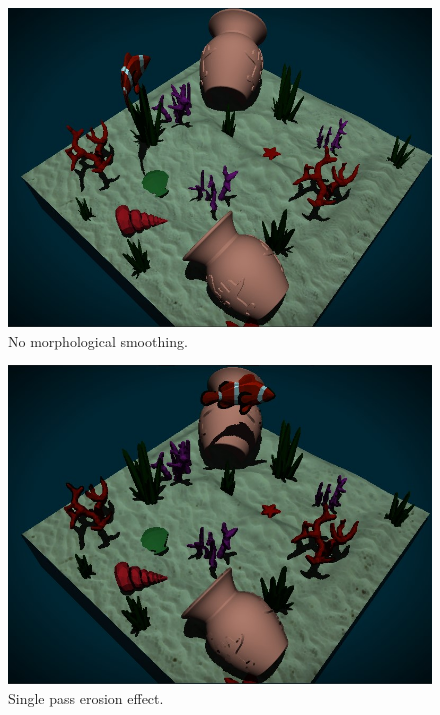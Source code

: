 \documentclass{article}
\begin{document}
\begin{figure}[h]
    \centering
    \includegraphics[width=\columnwidth]{imgs/no_smoothing_2.jpg}
    \caption{No morphological smoothing.}
    \label{fig:no_ms}
\end{figure}

\vspace{5em}

\begin{figure}[h]
    \centering
    \includegraphics[width=\columnwidth]{imgs/erosion.jpg}
    \caption{Single pass erosion effect.}
    \label{fig:erosion_ms}
\end{figure}

\newpage
\end{document}
